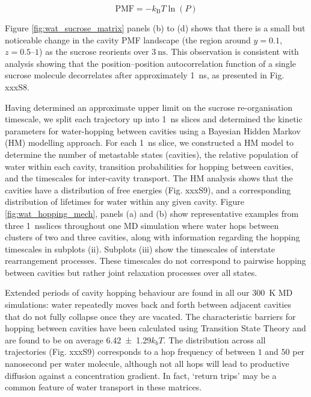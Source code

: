 \begin{equation}\label{eqn:pmf}
\mathrm{PMF}=-k_{\mathrm{B}} T \ln (P)
\end{equation}

Figure \ref{fig:wat_sucrose_matrix} panels (b) to (d) shows that there is a small but noticeable change in the cavity PMF landscape (the region around $y = 0.1$, $z = \numrange[range-phrase=-]{0.5}{1}$) as the sucrose reorients over $\SI{3}{\nano\second}$. This observation is consistent with analysis showing that the position–position autocorrelation function of a single sucrose molecule decorrelates after approximately \SI{1}{\nano\second}, as presented in Fig. xxxS8. 

Having determined an approximate upper limit on the sucrose re-organisation timescale, we split each trajectory up into \SI{1}{\nano\second} slices and determined the kinetic parameters for water-hopping between cavities using a Bayesian Hidden Markov (HM) modelling approach. For each \SI{1}{\nano\second} slice, we constructed a HM model to determine the number of metastable states (cavities), the relative population of water within each cavity, transition probabilities for hopping between cavities, and the timescales for inter-cavity transport. The HM analysis shows that the cavities have a distribution of free energies (Fig. xxxS9), and a corresponding distribution of lifetimes for water within any given cavity. Figure \ref{fig:wat_hopping_mech}, panels (a) and (b) show representative examples from three \SI{1}{\nano\second}slices throughout one MD simulation where water hops between clusters of two and three cavities, along with information regarding the hopping timescales in subplots (ii). Subplots (iii) show the timescales of interstate rearrangement processes. These timescales do not correspond to pairwise hopping between cavities but rather joint relaxation processes over all states.

Extended periods of cavity hopping behaviour are found in all our \SI{300}{\kelvin} MD simulations: water repeatedly moves back and forth between adjacent cavities that do not fully collapse once they are vacated. The characteristic barriers for hopping between cavities have been calculated using Transition State Theory and are found to be on average \num{6.42\pm1.29}$k_{b}T$. The distribution across all trajectories (Fig. xxxS9) corresponds to a hop frequency of between $1$ and $50$ per nanosecond per water molecule, although not all hops will lead to productive diffusion against a concentration gradient. In fact, `return trips’ may be a common feature of water transport in these matrices.

